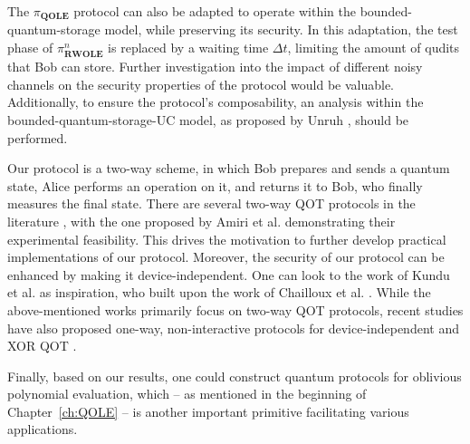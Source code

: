 The $\pi_{\textbf{QOLE}}$ protocol can also be adapted to operate within the bounded-quantum-storage model, while preserving its security. In this adaptation, the test phase of $\pi^n_{\textbf{RWOLE}}$ is replaced by a waiting time $\Delta t$, limiting the amount of qudits that Bob can store. Further investigation into the impact of different noisy channels on the security properties of the protocol would be valuable. Additionally, to ensure the protocol's composability, an analysis within the bounded-quantum-storage-UC model, as proposed by Unruh \cite{U11}, should be performed.

Our protocol is a two-way scheme, in which Bob prepares and sends a quantum state, Alice performs an operation on it, and returns it to Bob, who finally measures the final state. There are several two-way QOT protocols in the literature \cite{CZK18, ASRP21, KST21, CKS10, CGS16}, with the one proposed by Amiri et al. \cite{ASRP21} demonstrating their experimental feasibility. This drives the motivation to further develop practical implementations of our protocol. Moreover, the security of our protocol can be enhanced by making it device-independent. One can look to the work of Kundu et al. \cite{KST21} as inspiration, who built upon the work of Chailloux et al. \cite{CKS10}. While the above-mentioned works primarily focus on two-way QOT protocols, recent studies have also proposed one-way, non-interactive protocols for device-independent \cite{BY21} and XOR QOT \cite{SSH+21}.

Finally, based on our results, one could construct quantum protocols for oblivious polynomial evaluation, which -- as mentioned in the beginning of Chapter~\ref{ch:QOLE} -- is another important primitive facilitating various applications.






%
%
%
